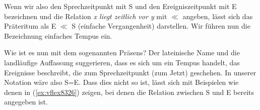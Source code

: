 \begin{exe}
  \ex\begin{xlist}
  \end{xlist}
\end{exe}


Wenn wir also den Sprechzeitpunkt mit S und den Ereigniszeitpunkt mit E bezeichnen und die Relation \textit{x liegt zeitlich vor y} mit $\ll$ angeben, lässt sich das Präteritum als E $\ll$ S (einfache Vergangenheit) darstellen.
Wir führen nun die Bezeichnung einfaches Tempus ein.


Wie ist es nun mit dem sogenannten Präsens?
Der lateinische Name und die landläufige Auffassung suggerieren, dass es sich um ein Tempus handelt, das Ereignisse beschreibt, die zum Sprechzeitpunkt (zum Jetzt) geschehen.
In unserer Notation wäre also S=E.
Dass dies nicht so ist, lässt sich mit Beispielen wie denen in (\ref{ex:vflex8326}) zeigen, bei denen die Relation zwischen S und E bereits angegeben ist.

\begin{exe}
  \ex\label{ex:vflex8326}
  \begin{xlist}
  \end{xlist}
\end{exe}


